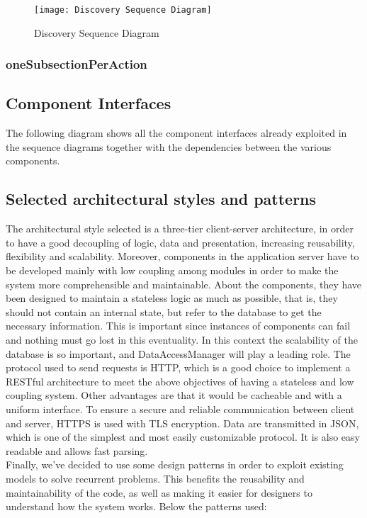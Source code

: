 \begin{figure}[H]
 \centering
 \texttt{[image: Discovery Sequence Diagram]}
 \caption{ Discovery Sequence Diagram }
 \end{figure}

\subsubsection{oneSubsectionPerAction}

\subsection{Component Interfaces}
The following diagram shows all the component interfaces already exploited in the sequence diagrams together with the dependencies between the various components. 
\newpage
\subsection{Selected architectural styles and patterns}
The architectural style selected is a three-tier client-server architecture, in order to have a good decoupling of logic, data and presentation, increasing reusability, flexibility and scalability. Moreover, components in the application server have to be developed mainly with low coupling among modules in order to make the system more comprehensible and maintainable. About the components, they have been designed to maintain a stateless logic as much as possible, that is, they should not contain an internal state, but refer to the database to get the necessary information. This is important since instances of components can fail and nothing must go lost in this eventuality. In this context the scalability of the database is so important, and DataAccessManager will play a leading role. 
The protocol used to send requests is HTTP, which is a good choice to implement a RESTful architecture to meet the above objectives of having a stateless and low coupling system. Other advantages are that it would be cacheable and with a uniform interface.
To ensure a secure and reliable communication between client and server, HTTPS is used with TLS encryption.
Data are transmitted in JSON, which is one of the simplest and most easily customizable protocol. It is also easy readable and allows fast parsing.\\
Finally, we've decided to use some design patterns in order to exploit existing models to solve recurrent problems. This benefits the reusability and maintainability of the code, as well as making it easier for designers to understand how the system works. Below the patterns used: \\

